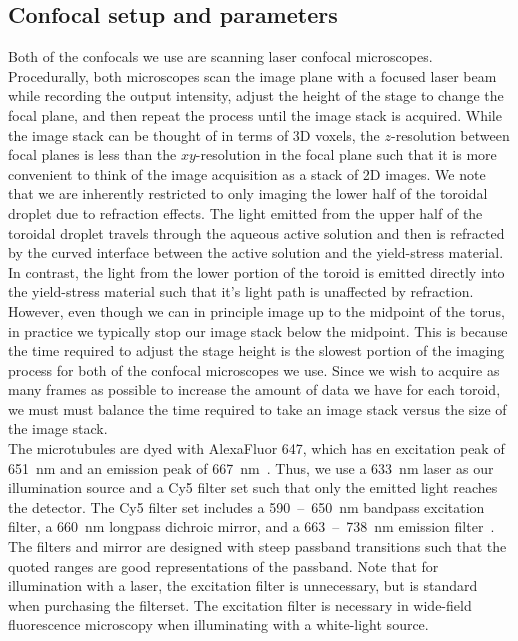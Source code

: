 \subsection{Confocal setup and parameters}
Both of the confocals we use are scanning laser confocal microscopes.
Procedurally, both microscopes scan the image plane with a focused laser beam while recording the output intensity, adjust the height of the stage to change the focal plane, and then repeat the process until the image stack is acquired.
While the image stack can be thought of in terms of 3D voxels, the $z$-resolution between focal planes is less than the $xy$-resolution in the focal plane such that it is more convenient to think of the image acquisition as a stack of 2D images.
We note that we are inherently restricted to only imaging the lower half of the toroidal droplet due to refraction effects.
The light emitted from the upper half of the toroidal droplet travels through the aqueous active solution and then is refracted by the curved interface between the active solution and the yield-stress material.
In contrast, the light from the lower portion of the toroid is emitted directly into the yield-stress material such that it's light path is unaffected by refraction.
However, even though we can in principle image up to the midpoint of the torus, in practice we typically stop our image stack below the midpoint.
This is because the time required to adjust the stage height is the slowest portion of the imaging process for both of the confocal microscopes we use.
Since we wish to acquire as many frames as possible to increase the amount of data we have for each toroid, we must must balance the time required to take an image stack versus the size of the image stack.\\

The microtubules are dyed with AlexaFluor 647, which has en excitation peak of 651~nm and an emission peak of 667~nm~\cite{RN264}.
Thus, we use a 633~nm laser as our illumination source and a Cy5 filter set such that only the emitted light reaches the detector.
The Cy5 filter set includes a 590~--~650~nm bandpass excitation filter, a 660~nm longpass dichroic mirror, and a 663~--~738~nm emission filter~\cite{RN263}.
The filters and mirror are designed with steep passband transitions such that the quoted ranges are good representations of the passband.
Note that for illumination with a laser, the excitation filter is unnecessary, but is standard when purchasing the filterset.
The excitation filter is necessary in wide-field fluorescence microscopy when illuminating with a white-light source.\\

